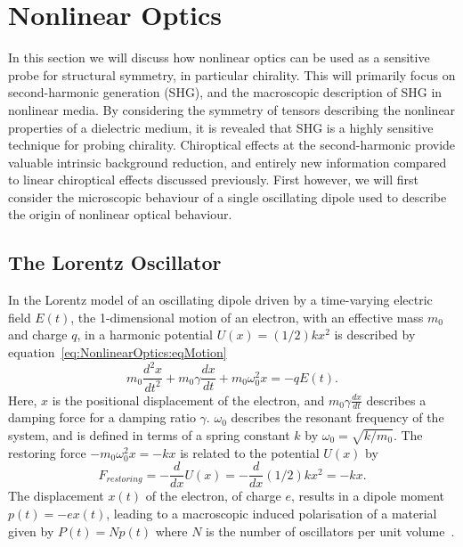 \chapter{Nonlinear Optics}\label{sec:background:NonlinearOptics}

In this section we will discuss how nonlinear optics can be used as a sensitive probe for structural symmetry, in particular chirality. This will primarily focus on second-harmonic generation (SHG), and the macroscopic description of SHG in nonlinear media. By considering the symmetry of tensors describing the nonlinear properties of a dielectric medium, it is revealed that SHG is a highly sensitive technique for probing chirality. Chiroptical effects at the second-harmonic provide valuable intrinsic background reduction, and entirely new information compared to linear chiroptical effects discussed previously. First however, we will first consider the microscopic behaviour of a single oscillating dipole used to describe the origin of nonlinear optical behaviour.

\section{The Lorentz Oscillator}\label{sec:background:NonlinearOptics:lorentz}
In the Lorentz model of an oscillating dipole driven by a time-varying electric field $E(t)$, the 1-dimensional motion of an electron, with an effective mass $m_0$ and charge $q$, in a harmonic potential $U(x) = (1/2)kx^{2}$ is described by equation~\ref{eq:NonlinearOptics:eqMotion}~\cite[\S 9.4]{Griffiths2013}\cite[\S 2.2.1]{fox2002optical}
\begin{equation}\label{eq:NonlinearOptics:eqMotion}
	m_{0} \frac{d^2 x}{dt^2} + m_{0} \gamma \frac{dx}{dt} + m_{0} \omega_{0}^2 x = -q E(t).
\end{equation}
Here, $x$ is the positional displacement of the electron, and $m_{0} \gamma \frac{dx}{dt}$ describes a damping force for a damping ratio $\gamma$. $\omega_{0}$ describes the resonant frequency of the system, and is defined in terms of a spring constant $k$ by $\omega_{0} = \sqrt{k/m_{0}}$. The restoring force $-m_{0} \omega_{0}^2 x = -kx$ is related to the potential $U(x)$ by
\begin{equation}
	F_{restoring} = -\frac{d}{dx} U(x) = -\frac{d}{dx} (1/2)kx^{2} = -kx.
\end{equation}
The displacement $x(t)$ of the electron, of charge $e$,  results in a dipole moment $p(t) = -ex(t)$, leading to a macroscopic induced polarisation of a material given by $P(t) = Np(t)$ where $N$ is the number of oscillators per unit volume~\cite[3.5.1]{Hecht2013}.

